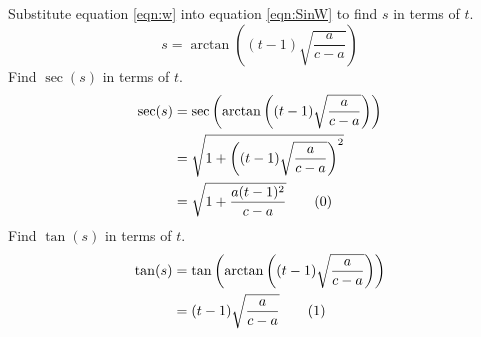 \documentclass{article}
\begin{document}
Substitute equation \ref{eqn:w} into equation \ref{eqn:SinW} to find $s$ in terms of $t$.
\begin{equation*}
    s=\arctan\left((t-1)\sqrt{\frac{a}{c-a}}\right)
\end{equation*}
Find $\sec(s)$ in terms of $t$.
\begin{align*}
    \sec(s) &= \sec\left(\arctan\left((t-1)\sqrt{\frac{a}{c-a}}\right)\right)\\
    &= \sqrt{1+\left((t-1)\sqrt{\frac{a}{c-a}}\right)^2}\\
    &= \sqrt{1+\frac{a(t-1)^2}{c-a}}\tag{\theequation}\label{eqn:secs}
    \stepcounter{equation}
\end{align*}
Find $\tan(s)$ in terms of $t$.
\begin{align*}
    \tan(s) &= \tan\left(\arctan\left((t-1)\sqrt{\frac{a}{c-a}}\right)\right)\\
    &= (t-1)\sqrt{\frac{a}{c-a}}\tag{\theequation}\label{eqn:tans}
    \stepcounter{equation}
\end{align*}
\end{document}
